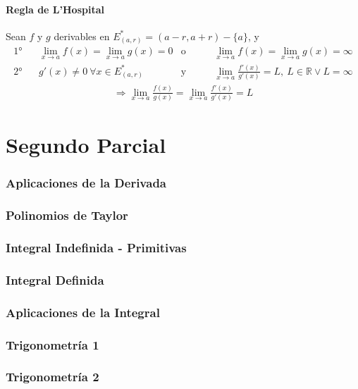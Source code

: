 \documentclass[11pt,titlepage]{article}
\newcommand{\commLim}[2]{\lim_{#1 \to #2}}
\begin{document}
\subsection{Regla de L'Hospital}
Sean $f$ y $g$ derivables en $E^{*}_{(a,r)} = (a - r, a + r) - \{a\}$, y
\begin{align*}
	\text{1°}& \ \ \ \ \commLim{x}{a} f(x) = \commLim{x}{a} g(x) = 0 &\text{o} \qquad &\commLim{x}{a} f(x) = 
	\commLim{x}{a} g(x) = \infty \\
	\text{2°}& \ \ \ \ g'(x) \neq 0 \ \forall x \in E^{*}_{(a,r)} &\text{y} \qquad &\commLim{x}{a} \frac{f'(x)}{g'(x)} = L, \ L \in
	\mathbb{R} \lor L = \infty
\end{align*}
\begin{gather*}
	\Rightarrow \commLim{x}{a} \frac{f(x)}{g(x)} = \commLim{x}{a} \frac{f'(x)}{g'(x)} = L
\end{gather*}


\newpage
\part{Segundo Parcial}

\section{Aplicaciones de la Derivada}


\vspace{1cm}
\section{Polinomios de Taylor}


\vspace{1cm}
\section{Integral Indefinida - Primitivas}


\vspace{1cm}
\section{Integral Definida}


\vspace{1cm}
\section{Aplicaciones de la Integral}

\newpage
\appendix
\begin{appendices}
	\section{Trigonometría 1}
	\clearpage
	
	\section{Trigonometría 2}
	\clearpage
	
\end{appendices}
\end{document}
